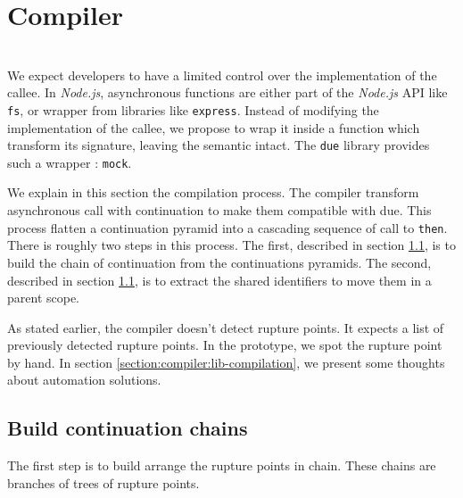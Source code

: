 \section{Compiler} \label{section:compiler}

\\
We expect developers to have a limited control over the implementation of the callee.
In \textit{Node.js}, asynchronous functions are either part of the \textit{Node.js} API like \texttt{fs}, or wrapper from libraries like \texttt{express}.
Instead of modifying the implementation of the callee, we propose to wrap it inside a function which transform its signature, leaving the semantic intact.
The \texttt{due} library provides such a wrapper : \texttt{mock}.



We explain in this section the compilation process.
The compiler transform asynchronous call with continuation to make them compatible with due.
This process flatten a continuation pyramid into a cascading sequence of call to \texttt{then}.
There is roughly two steps in this process.
The first, described in section \ref{section:compiler:chain}, is to build the chain of continuation from the continuations pyramids.
The second, described in section \ref{section:compiler:chain}, is to extract the shared identifiers to move them in a parent scope.

As stated earlier, the compiler doesn't detect rupture points.
It expects a list of previously detected rupture points.
In the prototype, we spot the rupture point by hand.
In section \ref{section:compiler:lib-compilation}, we present some thoughts about automation solutions.

\subsection{Build continuation chains} \label{section:compiler:chain}


The first step is to build arrange the rupture points in chain.
These chains are branches of trees of rupture points.


